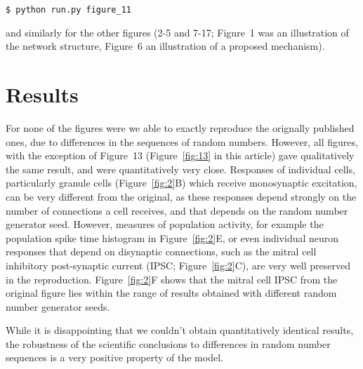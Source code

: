 \begin{verbatim}
$ python run.py figure_11
\end{verbatim}

and similarly for the other figures (2-5 and 7-17; Figure~1 was an illustration of the network structure, Figure~6 an illustration of a proposed mechanism).


\section{Results}


For none of the figures were we able to exactly reproduce the orignally published ones, due to differences in the sequences of random numbers.
However, all figures, with the exception of Figure~13 (Figure~\ref{fig:13} in this article) gave qualitatively the same result, and were quantitatively very close.
Responses of individual cells, particularly granule cells (Figure~\ref{fig:2}B) which receive monosynaptic excitation, can be very different from the original,
as these responses depend strongly on the number of connections a cell receives, and that depends on the random number generator seed.
However, measures of population activity, for example the population spike time histogram in Figure~\ref{fig:2}E,
or even individual neuron responses that depend on disynaptic connections, such as the mitral cell inhibitory post-synaptic current (IPSC; Figure~\ref{fig:2}C), are very well preserved in the reproduction.
Figure~\ref{fig:2}F shows that the mitral cell IPSC from the original figure lies within the range of results obtained with different random number generator seeds.

While it is disappointing that we couldn't obtain quantitatively identical results,
the robustness of the scientific conclusions to differences in random number sequences is a very positive property of the model.

